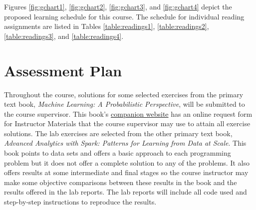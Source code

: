 \documentclass[12pt]{article}
\begin{document}
Figures \ref{fig:gchart1}, \ref{fig:gchart2}, \ref{fig:gchart3}, and \ref{fig:gchart4} depict the
proposed learning schedule for this course. The schedule for individual reading assignments are listed in Tables
\ref{table:readings1}, \ref{table:readings2}, \ref{table:readings3}, and \ref{table:readings4}.

\section{Assessment Plan}

Throughout the course, solutions for some selected exercises from the primary text book, \textit{Machine Learning: A Probabilistic
Perspective}, will be submitted to the course supervisor. This book's 
\href{https://mitpress.mit.edu/books/machine-learning-0}{companion website} has an online request form for Instructor Materials
that the course supervisor may use to attain all exercise solutions. The lab exercises are selected from the
other primary text book, \textit{Advanced Analytics with Spark: Patterns for Learning from Data at Scale}. This book points to
data sets and offers a basic approach to each programming problem but it does not offer a complete solution to any of the
problems.  It also offers results at some
intermediate and final stages so the course instructor may make some objective comparisons between these results in the book and
the results offered in the lab reports. The lab reports will include all code used and step-by-step instructions to reproduce the
results.
\end{document}
